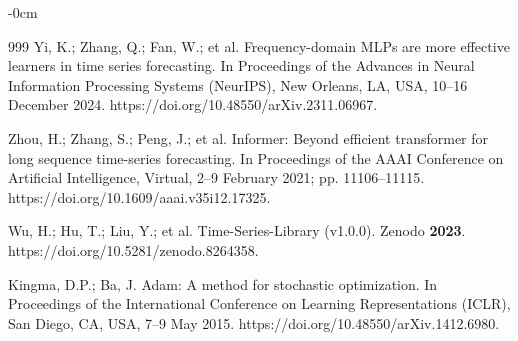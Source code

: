 \documentclass[electronics,article,submit,pdftex,moreauthors]{Definitions/mdpi}
\begin{document}
\begin{adjustwidth}{-\extralength}{0cm}
\begin{thebibliography}{999}
Yi, K.; Zhang, Q.; Fan, W.; et al. Frequency-domain MLPs are more effective learners in time series forecasting. In Proceedings of the Advances in Neural Information Processing Systems (NeurIPS), New Orleans, LA, USA, 10--16 December 2024. https://doi.org/10.48550/arXiv.2311.06967.

Zhou, H.; Zhang, S.; Peng, J.; et al. Informer: Beyond efficient transformer for long sequence time-series forecasting. In Proceedings of the AAAI Conference on Artificial Intelligence, Virtual, 2--9 February 2021; pp. 11106--11115. https://doi.org/10.1609/aaai.v35i12.17325.

Wu, H.; Hu, T.; Liu, Y.; et al. Time-Series-Library (v1.0.0). Zenodo \textbf{2023}. https://doi.org/10.5281/zenodo.8264358.

Kingma, D.P.; Ba, J. Adam: A method for stochastic optimization. In Proceedings of the International Conference on Learning Representations (ICLR), San Diego, CA, USA, 7--9 May 2015. https://doi.org/10.48550/arXiv.1412.6980.

\end{thebibliography}

\end{adjustwidth}
\end{document}
